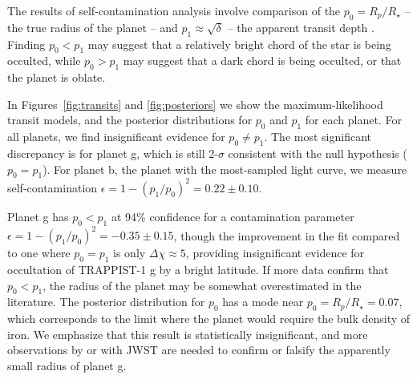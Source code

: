 The results of self-contamination analysis involve comparison of the $p_0 = R_p/R_\star$ -- the true radius of the planet -- and $p_1 \approx \sqrt{\delta}$ -- the apparent transit depth \citep{Morris2018f}. Finding $p_0 < p_1$ may suggest that a relatively bright chord of the star is being occulted, while $p_0 > p_1$ may suggest that a dark chord is being occulted, or that the planet is oblate. 

In Figures~\ref{fig:transits} and \ref{fig:posteriors} we show the maximum-likelihood transit models, and the posterior distributions for $p_0$ and $p_1$ for each planet. For all planets, we find insignificant evidence for $p_0 \neq p_1$. The most significant discrepancy is for planet g, which is still 2-$\sigma$ consistent with the null hypothesis ($p_0 = p_1$). For planet b, the planet with the most-sampled light curve, we measure self-contamination $\epsilon = 1 - (p_1/p_0)^2 = 0.22 \pm 0.10$. 

Planet g has $p_0 < p_1$ at 94\% confidence for a contamination parameter $\epsilon = 1 - (p_1/p_0)^2 = -0.35 \pm 0.15$, though the improvement in the fit compared to one where $p_0 = p_1$ is only $\Delta \chi \approx 5$, providing insignificant evidence for occultation of TRAPPIST-1 g by a bright latitude. If more data confirm that $p_0 < p_1$, the radius of the planet \citep[from, for example,][]{Delrez2018} may be somewhat overestimated in the literature. The posterior distribution for $p_0$ has a mode near $p_0=R_p/R_\star = 0.07$, which corresponds to the limit where the planet would require the bulk density of iron. We emphasize that this result is statistically insignificant, and more observations by \spitzer or with JWST are needed to confirm or falsify the apparently small radius of planet g.

